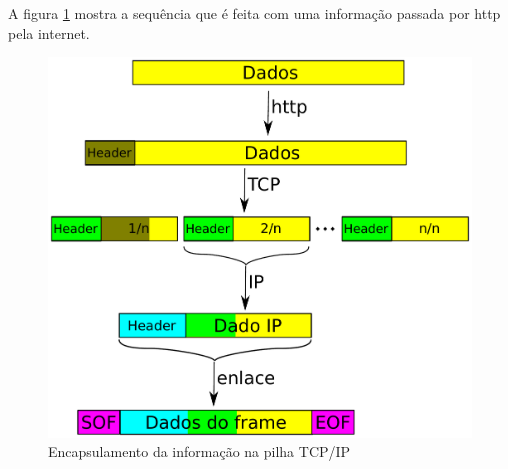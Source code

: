 	A figura \ref{fig:tcp-ip} mostra a sequência que é feita com uma informação passada por http pela internet.
	\begin{figure}[hbt]
		\begin{center}
			\includegraphics[width=\textwidth]{figuras/tcp-ip}
		\end{center}
		\caption{Encapsulamento da informação na pilha TCP/IP}
		\label{fig:tcp-ip}
	\end{figure}
